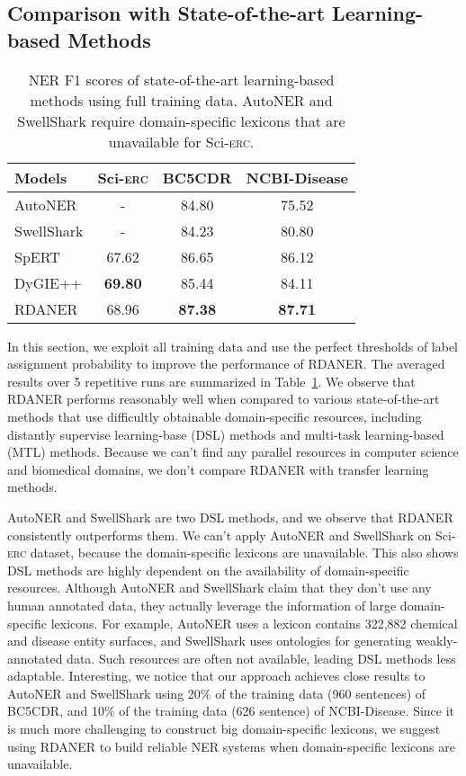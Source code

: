 \documentclass[10pt, conference, compsocconf]{IEEEtran}
\newcommand{\Scierc}{\textsc{S}ci-\textsc{erc}\xspace}
\newcommand{\rdaner}{\textsc{RDANER}\xspace}
\begin{document}
\subsection{Comparison with State-of-the-art Learning-based Methods}
\begin{table}[t]
    \caption{NER F1 scores of state-of-the-art learning-based methods using full training data.
    AutoNER and SwellShark require domain-specific lexicons that are unavailable for \Scierc.}
    \label{tal:sota}
    \centering
\begin{tabular}{lccc}
		\toprule
        Models & \Scierc & BC5CDR  & NCBI-Disease \\
\hline
        AutoNER\cite{shang-etal-2018-learning} & - & 84.80 & 75.52 \\ 
        SwellShark\cite{fries2017swellshark} & - & 84.23 & 80.80 \\ 
        \hline
        SpERT\cite{eberts2019span} & 67.62 &86.65  & 86.12 \\ 
        DyGIE++\cite{wadden-etal-2019-entity} & \textbf{69.80} & 85.44 & 84.11 \\ 
        \hline
\rdaner & 68.96 &  \textbf{87.38} &  \textbf{87.71} \\ 
		\bottomrule
    \end{tabular}
\end{table}
In this section, we exploit all training data and use the perfect thresholds of label assignment probability to 
improve the performance of \rdaner.
The averaged results over 5 repetitive runs are summarized in Table~\ref{tal:sota}.
We observe that \rdaner performs reasonably well when compared to various state-of-the-art methods
that use difficultly obtainable domain-specific resources, including distantly supervise learning-base (DSL) methods and
multi-task learning-based (MTL) methods. Because we can't find any parallel 
resources in computer science and biomedical domains, we don't compare
\rdaner with transfer learning methods. 

AutoNER and SwellShark are two DSL methods, and we observe that \rdaner consistently outperforms them.
We can't apply AutoNER and SwellShark on \Scierc dataset, because the domain-specific lexicons are unavailable.  
This also shows DSL methods are highly dependent on the availability of domain-specific resources. 
Although AutoNER and SwellShark claim that they don't use any human annotated data, they actually leverage the information of 
large domain-specific lexicons. For example, AutoNER uses a lexicon contains 322,882 chemical 
and disease entity surfaces, and SwellShark uses ontologies for generating weakly-annotated data. Such resources are often
not available, leading DSL methods less adaptable.
Interesting, we notice that our approach achieves close results to AutoNER and SwellShark using
20\% of the training data (960 sentences) of BC5CDR, and 10\% of the training data (626 sentence) of NCBI-Disease.
Since it is much more challenging to construct big domain-specific lexicons, 
we suggest using \rdaner to build reliable NER systems when domain-specific lexicons are unavailable.
\end{document}
